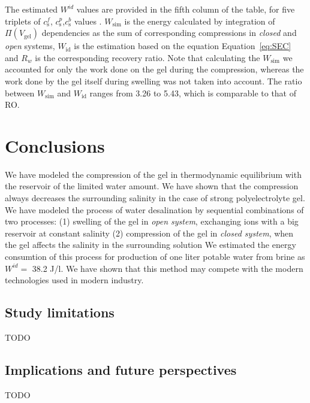 \documentclass[journal,article,submit,pdftex,moreauthors]{Definitions/mdpi}
\newcommand{\cs}{c_{\mathrm{s}}}
\newcommand{\Vgel}{V_\mathrm{gel}}
\newcommand{\Pgel}{\Pi}
\newcommand{\refeq}[1]{Equation~\ref{#1}{}}
\begin{document}
The estimated $W^{id}$ values are provided in the fifth column of the table, for five triplets of $\cs^f$, $\cs^p$,$\cs^b$ values .
$W_{\mathrm{sim}}$ is the energy calculated by integration of $\Pgel(\Vgel)$ dependencies as the sum of corresponding compressions in \emph{closed} and \emph{open} systems, $W_{\mathrm{id}}$ is the estimation based on the equation \refeq{eq:SEC} and $R_w$ is the corresponding recovery ratio.
Note that calculating the $W_{\mathrm{sim}}$ we accounted for only the work done on the gel during the compression, whereas the work done by the gel itself during swelling was not taken into account.
The ratio between $W_{\mathrm{sim}}$ and $W_{\mathrm{id}}$ ranges from 3.26 to 5.43, which is comparable to that of RO.


\section{Conclusions}
We have modeled the compression of the gel in thermodynamic equilibrium with the reservoir of the limited water amount.
We have shown that the compression always decreases the surrounding salinity in the case of strong polyelectrolyte gel.
We have modeled the process of water desalination by sequential combinations of two processes: 
(1) swelling of the gel in \emph{open system}, exchanging ions with a big reservoir at constant salinity
(2) compression of the gel in \emph{closed system}, when the gel affects the salinity in the surrounding solution
We estimated the energy consumtion of this process for production of one liter potable water from brine as $W^{id} =$ 38.2 J/l.
We have shown that this method may compete with the modern technologies used in modern industry. 

\subsection{Study limitations}
TODO

\subsection{Implications and future perspectives}
TODO


\vspace{6pt} 

\end{document}
